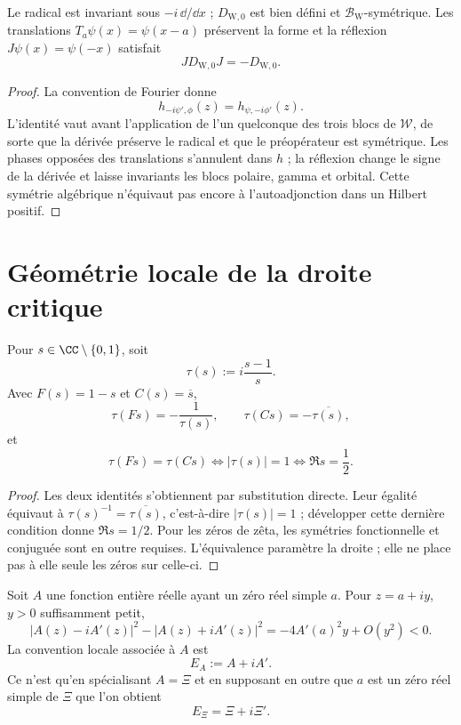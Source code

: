 \begin{theorem}
\label{pf84:E07}
Le radical est invariant sous \(-i\,\dd/\dd x\) ;
\(D_{\mathrm W,0}\) est bien défini et
\(\mathcal B_{\mathrm W}\)-symétrique. Les translations
\(T_a\psi(x)=\psi(x-a)\) préservent la forme et la réflexion
\(J\psi(x)=\psi(-x)\) satisfait
\[
 JD_{\mathrm W,0}J=-D_{\mathrm W,0}.
\]
\end{theorem}

\begin{proof}
La convention de Fourier donne
\[
 h_{-i\psi',\phi}(z)=h_{\psi,-i\phi'}(z).
\]
L'identité vaut avant l'application de l'un quelconque des trois blocs de
\(\mathcal W\), de sorte que la dérivée préserve le radical et que le
préopérateur est symétrique. Les phases opposées des translations s'annulent
dans \(h\) ; la réflexion change le signe de la dérivée et laisse invariants les
blocs polaire, gamma et orbital. Cette symétrie algébrique n'équivaut pas encore
à l'autoadjonction dans un Hilbert positif.
\end{proof}

\section{Géométrie locale de la droite critique}

\begin{lemma}
\label{pf84:RH-01}
Pour \(s\in\CC\setminus\{0,1\}\), soit
\[
 \tau(s):=i\frac{s-1}{s}.
\]
Avec \(F(s)=1-s\) et
\(C(s)=\overline s\),
\[
 \tau(Fs)=-\frac1{\tau(s)},
 \qquad
 \tau(Cs)=-\overline{\tau(s)},
\]
et
\[
 \tau(Fs)=\tau(Cs)
 \iff |\tau(s)|=1
 \iff \Re s=\frac12.
\]
\end{lemma}

\begin{proof}
Les deux identités s'obtiennent par substitution directe. Leur égalité
équivaut à \(\tau(s)^{-1}=\overline{\tau(s)}\), c'est-à-dire
\(|\tau(s)|=1\) ; développer cette dernière condition donne
\(\Re s=1/2\). Pour les zéros de zêta, les symétries
fonctionnelle et conjuguée sont en outre requises. L'équivalence paramètre la droite ; elle ne place pas à elle
seule les zéros sur celle-ci.
\end{proof}

\begin{lemma}
\label{pf84:RH-04}
Soit \(A\) une fonction entière réelle ayant un zéro réel simple \(a\). Pour
\(z=a+iy\), \(y>0\) suffisamment petit,
\[
|A(z)-iA'(z)|^2-|A(z)+iA'(z)|^2
 =-4A'(a)^2y+O(y^2)<0.
\]
La convention locale associée à \(A\) est
\[
 E_A:=A+iA'.
\]
Ce n'est qu'en spécialisant \(A=\Xi\) et en supposant en outre que \(a\) est un zéro réel
simple de \(\Xi\) que l'on obtient
\[
 E_\Xi=\Xi+i\Xi'.
\]
\end{lemma}

